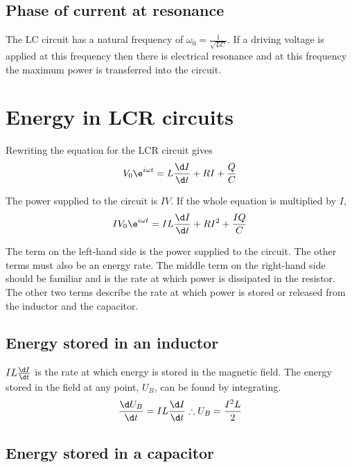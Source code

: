 \documentclass[
]{book}
\begin{document}
\hypertarget{phase-of-current-at-resonance}{%
\subsection*{Phase of current at resonance}\label{phase-of-current-at-resonance}}

The LC circuit has a natural frequency of
\(\omega_0 = \frac{1}{\sqrt{LC}}\). If a driving voltage is applied at
this frequency then there is electrical resonance and at this frequency
the maximum power is transferred into the circuit.

\hypertarget{energy-in-lcr-circuits}{%
\section{Energy in LCR circuits}\label{energy-in-lcr-circuits}}

Rewriting the equation for the LCR circuit gives
\[V_0 \e^{i\omega t} = L \frac{\d I}{\d t} + RI + \frac{Q}{C}\]

The power supplied to the circuit is \(IV\). If the whole equation is
multiplied by \(I\),
\[I V_0 \e^{i\omega t} = IL \frac{\d I}{\d t} + RI^2 + \frac{IQ}{C}\]

The term on the left-hand side is the power supplied to the circuit. The
other terms must also be an energy rate. The middle term on the
right-hand side should be familiar and is the rate at which power is
dissipated in the resistor. The other two terms describe the rate at
which power is stored or released from the inductor and the capacitor.

\hypertarget{energy-stored-in-an-inductor}{%
\subsection{Energy stored in an inductor}\label{energy-stored-in-an-inductor}}

\(IL \frac{\d I}{\d t}\) is the rate at which energy is stored in the
magnetic field. The energy stored in the field at any point, \(U_B\), can
be found by integrating.
\[\frac{\d U_B}{\d t} = IL \frac{\d I}{\d t} \therefore U_B = \frac{I^2 L}{2}\]

\hypertarget{energy-stored-in-a-capacitor}{%
\subsection{Energy stored in a capacitor}\label{energy-stored-in-a-capacitor}}
\end{document}
